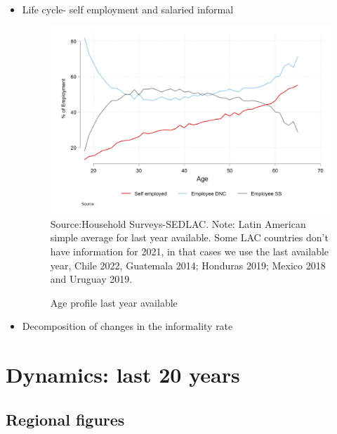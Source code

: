\documentclass[english]{article}
\begin{document}
\begin{itemize}
\item Life cycle- self employment and salaried informal
 \begin{figure}[!htb]
        \centering
        \caption{Age profile last year available}     
        \includegraphics[scale=.3]{latex/figures/Snapshot/age_profile.png}
        \label{fig:age_pro}
        \footnotesize{Source:Household Surveys-SEDLAC.}
        \footnotesize{Note: Latin American simple average for last year available. Some LAC countries don’t have information for 2021, in that cases we use the last available year, Chile 2022, Guatemala 2014; Honduras 2019; Mexico 2018 and Uruguay 2019.}
        \end{figure}
\item Decomposition of changes in the informality rate

\end{itemize}

     

     
     
\section{Dynamics: last 20 years}  
 

\subsection{Regional figures}
\end{document}
